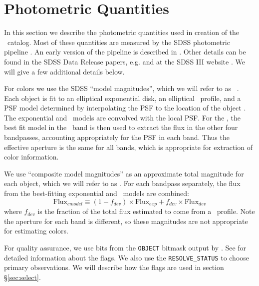 \documentclass{emulateapj}
\begin{document}
\section{Photometric Quantities} \label{sec:photo}

In this section we describe the photometric quantities used in creation of the
\photoz\ catalog.  Most of these quantities are measured by the SDSS
photometric pipeline \photo. An early version of the pipeline is described in
\citet{LuptonADASS01}.  Other details can be found in the SDSS Data Release
papers, e.g. \citet{dr4} and at the SDSS III website \citep{sdssorg}.  We will
give a few additional details below.

For colors we use the SDSS ``model magnitudes'', which we will refer to as
\modelmag\ \citep{dr7photo}.  Each object is fit to an elliptical exponential
disk, an elliptical \devauc\ profile, and a PSF model determined by
interpolating the PSF to the location of the
object \citep{LuptonADASS01,Sheldon04}.  The exponential and \devauc\ models are
convolved with the local PSF.  For the \modelmag, the best fit model in the
\rmag\ band is then used to extract the flux in the other four bandpasses,
accounting appropriately for the PSF in each band. Thus the effective aperture
is the same for all bands, which is appropriate for extraction of color
information.

We use ``composite model magnitudes'' as an approximate total magnitude for
each object, which we will refer to as \cmodelmag.  For each bandpass
separately, the flux from the best-fitting exponential and \devauc\ models are
combined:
\begin{equation}
\textrm{Flux}_{cmodel} \equiv (1-f_{dev})\times \textrm{Flux}_{exp} + f_{dev} \times \textrm{Flux}_{dev}
\end{equation}
where $f_{dev}$ is the fraction of the total flux estimated to come from a
\devauc\ profile\citep{dr7photo}.  Note the aperture for each band is
different, so these magnitudes are not appropriate for estimating colors.

For quality assurance, we use bits from the \texttt{OBJECT} bitmask output by
\photo.  See \citet{dr7flags} for detailed information about the flags.    We
also use the \texttt{RESOLVE\_STATUS} \citep{dr7resolve} to choose primary
observations.  We will describe how the flags are used in section \S \ref{sec:select}.

    
\end{document}
